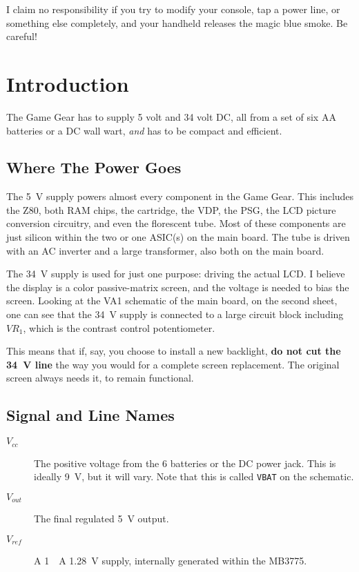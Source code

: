 \documentclass{article}
\newcommand{\Vcc}{$V_{cc}$}
\newcommand{\Vout}{$V_{out}$}
\newcommand{\Vref}{$V_{ref}$}
\newcommand{\model}{\textsf}
\begin{document}
I claim no responsibility if you try to modify your console, tap a
power line, or something else completely, and your handheld releases
the magic blue smoke. Be careful!

\section{Introduction}
The Game Gear has to supply 5 volt and 34 volt DC, all from a set of
six AA batteries or a DC wall wart, \textit{and} has to be compact and
efficient.

\subsection{Where The Power Goes}
The \qty{5}{\volt} supply powers almost every component in the Game
Gear. This includes the \model{Z80}, both RAM chips, the cartridge,
the VDP, the PSG, the LCD picture conversion circuitry, and even the
florescent tube. Most of these components are just silicon within the
two or one ASIC(s) on the main board. The tube is driven with an AC
inverter and a large transformer, also both on the main board.

The \qty{34}{\volt} supply is used for just one purpose: driving the
actual LCD. I believe the display is a color passive-matrix screen,
and the voltage is needed to bias the screen. Looking at the
\model{VA1} schematic of the main board, on the second sheet, one can
see that the \qty{34}{\volt} supply is connected to a large circuit
block including $VR_1$, which is the contrast control potentiometer.

This means that if, say, you choose to install a new backlight,
\textbf{do not cut the \qty{34}{\volt} line} the way you would for a
complete screen replacement. The original screen always needs it, to
remain functional.

\subsection{Signal and Line Names}
\begin{description}
\item[\Vcc{}] The positive voltage from the 6 batteries or the DC power
  jack. This is ideally \qty{9}{\volt}, but it will vary. Note that
  this is called \texttt{VBAT} on the schematic.
\item[\Vout{}] The final regulated \qty{5}{\volt} output.
\item[\Vref{}] A \qty{1}{\milli{}A} \qty{1.28}{\volt} supply,
  internally generated within the \model{MB3775}.
\end{description}
\end{document}
